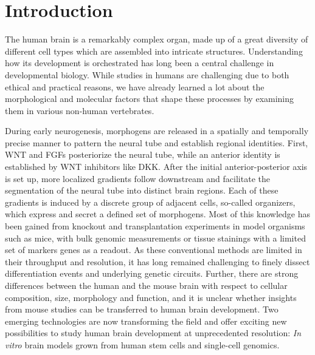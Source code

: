 \thispagestyle{plain}
\section{Introduction}




The human brain is a remarkably complex organ, made up of a great diversity of different cell types which are assembled into intricate structures. Understanding how its development is orchestrated has long been a central challenge in developmental biology. While studies in humans are challenging due to both ethical and practical reasons, we have already learned a lot about the morphological and molecular factors that shape these processes by examining them in various non-human vertebrates.


During early neurogenesis, morphogens are released in a spatially and temporally precise manner to pattern the neural tube and establish regional identities. First, WNT and FGFs posteriorize the neural tube, while an anterior identity is established by WNT inhibitors like DKK. After the initial anterior-posterior axis is set up, more localized gradients follow downstream and facilitate the segmentation of the neural tube into distinct brain regions. Each of these gradients is induced by a discrete group of adjacent cells, so-called organizers, which express and secret a defined set of morphogens. Most of this knowledge has been gained from knockout and transplantation experiments in model organisms such as mice, with bulk genomic measurements or tissue stainings with a limited set of markers genes as a readout. As these conventional methods are limited in their throughput and resolution, it has long remained challenging to finely dissect differentiation events and underlying genetic circuits. Further, there are strong differences between the human and the mouse brain with respect to cellular composition, size, morphology and function, and it is unclear whether insights from mouse studies can be transferred to human brain development. Two emerging technologies are now transforming the field and offer exciting new possibilities to study human brain development at unprecedented resolution: ​\textit{In vitro} brain models grown from human stem cells and single-cell genomics.

